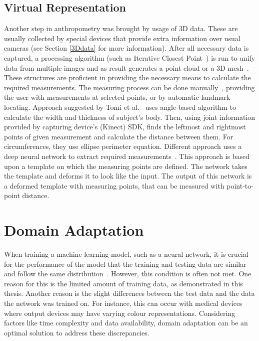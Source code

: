 \subsection{Virtual Representation}
Another step in anthropometry was brought by usage of 3D data. These are usually collected by special devices that provide extra information over usual cameras (see Section \ref{3Ddata} for more information). After all necessary data is captured, a processing algorithm (such as Iterative Closest Point~\cite{pointcloudProcess}) is run to unify data from multiple images and as result generates a point cloud or a 3D mesh~\cite{digitalAnthro}. These structures are proficient in providing the necessary means to calculate the required measurements. The measuring process can be done manually~\cite{3Dextraction}, providing the user with measurements at selected points, or by automatic landmark locating. Approach suggested by Tomi et al.~\cite{kinect} uses angle-based algorithm to calculate the width and thickness of subject's body. Then, using joint information provided by capturing device's (Kinect) SDK, finds the leftmost and rightmost points of given measurement and calculate the distance between them. For circumferences, they use ellipse perimeter equation. Different approach uses a deep neural network to extract required measurements~\cite{pointcloudNN}. This approach is based upon a template on which the measuring points are defined. The network takes the template and deforms it to look like the input. The output of this network is a deformed template with measuring points, that can be measured with point-to-point distance.


\section{Domain Adaptation}
When training a machine learning model, such as a neural network, it is crucial for the performance of the model that the training and testing data are similar and follow the same distribution~\cite{domainAdaptation}. However, this condition is often not met. One reason for this is the limited amount of training data, as demonstrated in this thesis. Another reason is the slight differences between the test data and the data the network was trained on. For instance, this can occur with medical devices where output devices may have varying colour representations. Considering factors like time complexity and data availability, domain adaptation can be an optimal solution to address these discrepancies.

